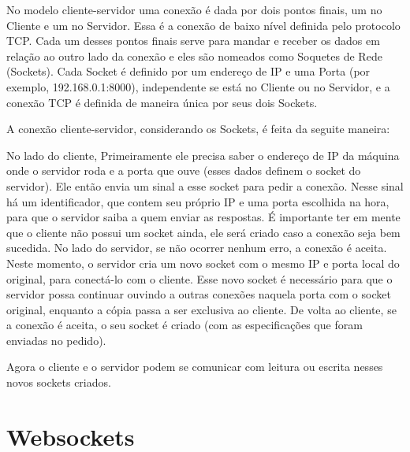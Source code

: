 \documentclass[a4paper,12pt]{article}
\begin{document}
No modelo cliente-servidor uma conexão é dada por dois pontos finais, um no Cliente e um no Servidor. Essa é a conexão de baixo nível definida pelo protocolo TCP. Cada um desses pontos finais serve para mandar e receber os dados em relação ao outro lado da conexão e eles são nomeados como Soquetes de Rede (Sockets). Cada Socket é definido por um endereço de IP e uma Porta (por exemplo, 192.168.0.1:8000), independente se está no Cliente ou no Servidor, e a conexão TCP é definida de maneira única por seus dois Sockets.

A conexão cliente-servidor, considerando os Sockets, é feita da seguite maneira:

No lado do cliente, Primeiramente ele precisa saber o endereço de IP da máquina onde o servidor roda e a porta que ouve (esses dados definem o socket do servidor). Ele então envia um sinal a esse socket para pedir a conexão. Nesse sinal há um identificador, que contem seu próprio IP e uma porta escolhida na hora, para que o servidor saiba a quem enviar as respostas. É importante ter em mente que o cliente não possui um socket ainda, ele será criado caso a conexão seja bem sucedida.
No lado do servidor, se não ocorrer nenhum erro, a conexão é aceita. Neste momento, o servidor cria um novo socket com o mesmo IP e porta local do original, para conectá-lo com o cliente. Esse novo socket é necessário para que o servidor possa continuar ouvindo a outras conexões naquela porta com o socket original, enquanto a cópia passa a ser exclusiva ao cliente.
De volta ao cliente, se a conexão é aceita, o seu socket é criado (com as especificações que foram enviadas no pedido).

Agora o cliente e o servidor podem se comunicar com leitura ou escrita nesses novos sockets criados.





\section{Websockets}
\end{document}
